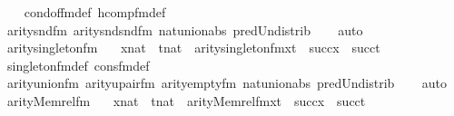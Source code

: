 \begin{isabellebody}
%
\isadelimproof
\ \ %
\endisadelimproof
%
\isatagproof
{}\isamarkupfalse%
\ cond{\isacharunderscore}{\kern0pt}of{\isacharunderscore}{\kern0pt}fm{\isacharunderscore}{\kern0pt}def\ hcomp{\isacharunderscore}{\kern0pt}fm{\isacharunderscore}{\kern0pt}def\isanewline
\ \ \isamarkupfalse%
\ arity{\isacharunderscore}{\kern0pt}snd{\isacharunderscore}{\kern0pt}fm\ arity{\isacharunderscore}{\kern0pt}snd{\isacharunderscore}{\kern0pt}snd{\isacharunderscore}{\kern0pt}fm\ nat{\isacharunderscore}{\kern0pt}union{\isacharunderscore}{\kern0pt}abs{}\ pred{\isacharunderscore}{\kern0pt}Un{\isacharunderscore}{\kern0pt}distrib\isanewline
\ \ \isamarkupfalse%
\ auto%
\endisatagproof
{\isafoldproof}%
%
\isadelimproof
\isanewline
%
\endisadelimproof
\isanewline
{}\isamarkupfalse%
\ arity{\isacharunderscore}{\kern0pt}singleton{\isacharunderscore}{\kern0pt}fm\ {\isacharcolon}{\kern0pt}\isanewline
\ \ {\isachardoublequoteopen}{\isasymlbrakk}x{\isasymin}nat\ {\isacharsemicolon}{\kern0pt}\ t{\isasymin}nat{\isasymrbrakk}\ {\isasymLongrightarrow}\ arity{\isacharparenleft}{\kern0pt}singleton{\isacharunderscore}{\kern0pt}fm{\isacharparenleft}{\kern0pt}x{\isacharcomma}{\kern0pt}t{\isacharparenright}{\kern0pt}{\isacharparenright}{\kern0pt}\ {\isacharequal}{\kern0pt}\ succ{\isacharparenleft}{\kern0pt}x{\isacharparenright}{\kern0pt}\ {\isasymunion}\ succ{\isacharparenleft}{\kern0pt}t{\isacharparenright}{\kern0pt}{\isachardoublequoteclose}\isanewline
%
\isadelimproof
\ \ %
\endisadelimproof
%
\isatagproof
{}\isamarkupfalse%
\ singleton{\isacharunderscore}{\kern0pt}fm{\isacharunderscore}{\kern0pt}def\ cons{\isacharunderscore}{\kern0pt}fm{\isacharunderscore}{\kern0pt}def\isanewline
\ \ \isamarkupfalse%
\ arity{\isacharunderscore}{\kern0pt}union{\isacharunderscore}{\kern0pt}fm\ arity{\isacharunderscore}{\kern0pt}upair{\isacharunderscore}{\kern0pt}fm\ arity{\isacharunderscore}{\kern0pt}empty{\isacharunderscore}{\kern0pt}fm\ nat{\isacharunderscore}{\kern0pt}union{\isacharunderscore}{\kern0pt}abs{}\ pred{\isacharunderscore}{\kern0pt}Un{\isacharunderscore}{\kern0pt}distrib\isanewline
\ \ \isamarkupfalse%
\ auto%
\endisatagproof
{\isafoldproof}%
%
\isadelimproof
\isanewline
%
\endisadelimproof
\isanewline
{}\isamarkupfalse%
\ arity{\isacharunderscore}{\kern0pt}Memrel{\isacharunderscore}{\kern0pt}fm\ {\isacharcolon}{\kern0pt}\isanewline
\ \ {\isachardoublequoteopen}{\isasymlbrakk}x{\isasymin}nat\ {\isacharsemicolon}{\kern0pt}\ t{\isasymin}nat{\isasymrbrakk}\ {\isasymLongrightarrow}\ arity{\isacharparenleft}{\kern0pt}Memrel{\isacharunderscore}{\kern0pt}fm{\isacharparenleft}{\kern0pt}x{\isacharcomma}{\kern0pt}t{\isacharparenright}{\kern0pt}{\isacharparenright}{\kern0pt}\ {\isacharequal}{\kern0pt}\ succ{\isacharparenleft}{\kern0pt}x{\isacharparenright}{\kern0pt}\ {\isasymunion}\ succ{\isacharparenleft}{\kern0pt}t{\isacharparenright}{\kern0pt}{\isachardoublequoteclose}\isanewline

\end{isabellebody}

